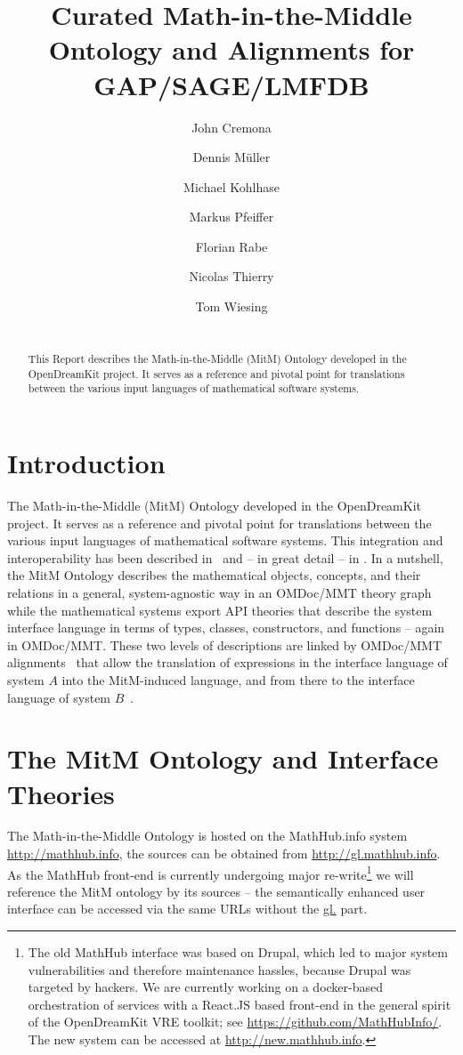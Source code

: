 \documentclass[book]{deliverablereport}
\title{Curated Math-in-the-Middle Ontology and Alignments for GAP/SAGE/LMFDB}
\author{John Cremona}
\author{Dennis M\"uller}
\author{Michael Kohlhase}
\author{Markus Pfeiffer}
\author{Florian Rabe}
\author{Nicolas Thierry}
\author{Tom Wiesing}
\begin{document}
\begin{abstract}\strut\\
  This Report describes the Math-in-the-Middle (MitM) Ontology developed in the
  OpenDreamKit project. It serves as a reference and pivotal point for translations
  between the various input languages of mathematical software systems. 
\end{abstract}
\maketitle
\newpage\tableofcontents\newpage

\section{Introduction}
The Math-in-the-Middle (MitM) Ontology developed in the OpenDreamKit project. It serves as
a reference and pivotal point for translations between the various input languages of
mathematical software systems. This integration and interoperability has been described
in~\cite{DehKohKon:iop16,WieKohRab:vtuimkb17,KohMuePfe:kbimss17} and -- in great detail --
in \cite{ODK-D6.5}. In a nutshell, the MitM Ontology describes the mathematical objects,
concepts, and their relations in a general, system-agnostic way in an OMDoc/MMT theory
graph while the mathematical systems export API theories that describe the system
interface language in terms of types, classes, constructors, and functions -- again in
OMDoc/MMT. These two levels of descriptions are linked by OMDoc/MMT
alignments~\cite{MueGauKal:cacfms17} that allow the translation of expressions in the
interface language of system $A$ into the MitM-induced language, and from there to the
interface language of system $B$~\cite{MueRoYuRa:abtafs17}.

\section{The MitM Ontology and Interface Theories}
The Math-in-the-Middle Ontology is hosted on the MathHub.info system
\url{http://mathhub.info}, the sources can be obtained from
\url{http://gl.mathhub.info}. As the MathHub front-end is currently undergoing major
re-write\footnote{The old MathHub interface was based on Drupal, which led to major system
  vulnerabilities and therefore maintenance hassles, because Drupal was targeted by
  hackers. We are currently working on a docker-based orchestration of services with a
  React.JS based front-end in the general spirit of the OpenDreamKit VRE toolkit; see
  \url{https://github.com/MathHubInfo/}. The new system can be accessed at
  \url{http://new.mathhub.info}.} we will reference the MitM ontology by its sources --
the semantically enhanced user interface can be accessed via the same URLs without the
\url{gl.} part.
\end{document}

